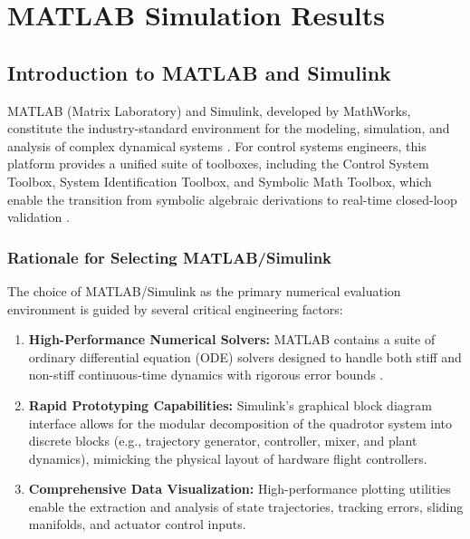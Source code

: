 \chapter{MATLAB Simulation Results}
\label{ch:matlab_results}

\section{Introduction to MATLAB and Simulink}
MATLAB (Matrix Laboratory) and Simulink, developed by MathWorks, constitute the industry-standard environment for the modeling, simulation, and analysis of complex dynamical systems \cite{ref_82}. For control systems engineers, this platform provides a unified suite of toolboxes, including the Control System Toolbox, System Identification Toolbox, and Symbolic Math Toolbox, which enable the transition from symbolic algebraic derivations to real-time closed-loop validation \cite{ref_82}.

\subsection{Rationale for Selecting MATLAB/Simulink}
The choice of MATLAB/Simulink as the primary numerical evaluation environment is guided by several critical engineering factors:
\begin{enumerate}
    \item \textbf{High-Performance Numerical Solvers:} MATLAB contains a suite of ordinary differential equation (ODE) solvers designed to handle both stiff and non-stiff continuous-time dynamics with rigorous error bounds \cite{ref_83}.
    \item \textbf{Rapid Prototyping Capabilities:} Simulink’s graphical block diagram interface allows for the modular decomposition of the quadrotor system into discrete blocks (e.g., trajectory generator, controller, mixer, and plant dynamics), mimicking the physical layout of hardware flight controllers.
    \item \textbf{Comprehensive Data Visualization:} High-performance plotting utilities enable the extraction and analysis of state trajectories, tracking errors, sliding manifolds, and actuator control inputs.
\end{enumerate}

